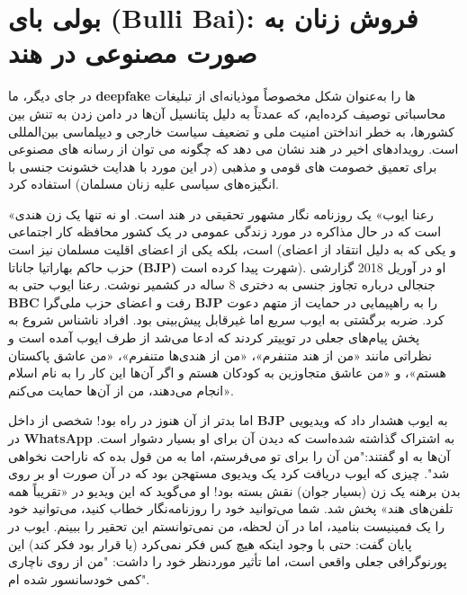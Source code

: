 {
{
\section*{بولی بای \textenglish{\textbf{(Bulli Bai)}}: فروش زنان به صورت مصنوعی در هند}
}
\label{sec:بولی بای (Bulli Bai): فروش زنان به صورت مصنوعی در هند}
\noindent در جای دیگر، ما \textenglish{\textbf{deepfake}} ها را به‌عنوان شکل مخصوصاً موذیانه‌ای از تبلیغات محاسباتی توصیف کرده‌ایم، که عمدتاً به دلیل پتانسیل آن‌ها در دامن زدن به تنش بین کشورها، به خطر انداختن امنیت ملی و تضعیف سیاست خارجی و دیپلماسی بین‌المللی است. رویدادهای اخیر در هند نشان می دهد که چگونه می توان از رسانه های مصنوعی برای تعمیق خصومت های قومی و مذهبی (در این مورد با هدایت خشونت جنسی با انگیزه‌های سیاسی علیه زنان مسلمان) استفاده کرد.
}

«رعنا ایوب» یک روزنامه نگار مشهور تحقیقی در هند است.
او نه تنها یک زن هندی است که در حال مذاکره در مورد زندگی عمومی در یک کشور محافظه کار اجتماعی است، بلکه یکی از اعضای اقلیت مسلمان نیز است (و یکی که به دلیل انتقاد از اعضای حزب حاکم بهاراتیا جاناتا \textenglish{\textbf{(BJP)}} شهرت پیدا کرده است).
او در آوریل 2018 گزارشی جنجالی درباره تجاوز جنسی به دختری 8 ساله در کشمیر نوشت.
رعنا ایوب حتی به \textenglish{\textbf{BBC}} رفت و اعضای حزب ملی‌گرا \textenglish{\textbf{BJP}} را به راهپیمایی در حمایت از متهم دعوت کرد.
ضربه برگشتی به ایوب سریع اما غیرقابل پیش‌بینی بود.
افراد ناشناس شروع به پخش پیام‌های جعلی در توییتر کردند که ادعا می‌شد از طرف ایوب آمده است و نظراتی مانند «من از هند متنفرم»، «من از هندی‌ها متنفرم»، «من عاشق پاکستان هستم»، و «من عاشق متجاوزین به کودکان هستم و اگر آن‌ها این کار را به نام اسلام انجام می‌دهند، من از آن‌ها حمایت می‌کنم».

اما بدتر از آن هنوز در راه بود!
شخصی از داخل \textenglish{\textbf{BJP}} به ایوب هشدار داد که ویدیویی در \textenglish{\textbf{WhatsApp}} به اشتراک گذاشته شده‌است که دیدن آن برای او بسیار دشوار است.
آن‌ها به او گفتند:"من آن را برای تو می‌فرستم، اما به من قول بده که ناراحت نخواهی شد".
چیزی که ایوب دریافت کرد یک ویدیوی مستهجن بود که در آن صورت او بر روی بدن برهنه یک زن (بسیار جوان) نقش بسته بود!
او می‌گوید که این ویدیو در «تقریباً همه تلفن‌های هند» پخش شد.
شما می‌توانید خود را روزنامه‌نگار خطاب کنید، می‌توانید خود را یک فمینیست بنامید، اما در آن لحظه، من نمی‌توانستم این تحقیر را ببینم.
ایوب در پایان گفت: حتی با وجود اینکه هیچ کس فکر نمی‌کرد (یا قرار بود فکر کند) این پورنوگرافی جعلی واقعی است، اما تأثیر مورد‌نظر خود را داشت: "من از روی ناچاری کمی خودسانسور شده ام".

